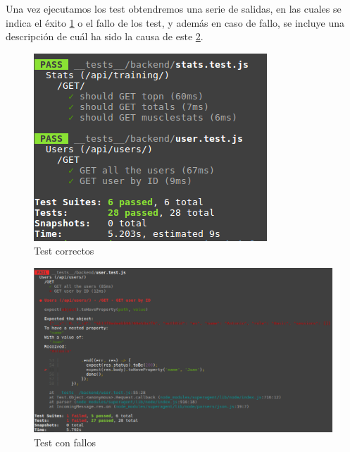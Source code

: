 Una vez ejecutamos los test obtendremos una serie de salidas, en las cuales se indica el éxito \ref{fig:testok} o el fallo de los test, y además en caso de fallo, se incluye una descripción de cuál ha sido la causa de este \ref{fig:testfail}.
\begin{figure}
  \begin{center}
    \includegraphics[width=\textwidth]{imagenes/test_pass.png}
    \caption{Test correctos}
    \label{fig:testok}
  \end{center}
\end{figure}
\begin{figure}
  \begin{center}
    \includegraphics[width=\textwidth]{imagenes/test_fail.png}
    \caption{Test con fallos}
    \label{fig:testfail}
  \end{center}
\end{figure}

